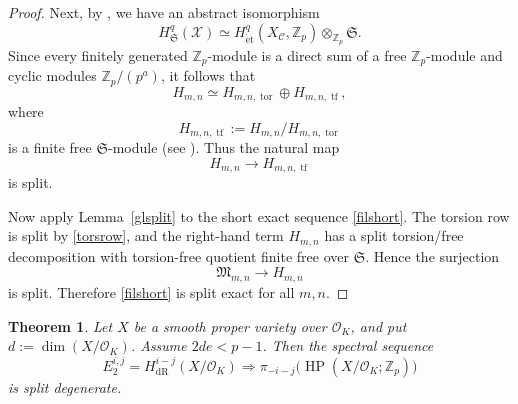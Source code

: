 \documentclass[11pt]{amsart}
\newtheorem{thm}[lemma]{Theorem}
\numberwithin{equation}{section}
\newcommand{\Z}{\mathbb{Z}}
\newcommand{\sC}{\mathcal{C}}
\newcommand{\sO}{\mathcal{O}}
\newcommand{\tf}{\operatorname{tf}}
\newcommand{\tors}{\operatorname{tor}}
\newcommand{\sX}{\mathcal{X}}
\newcommand{\mf}{\mathfrak}
\newcommand{\fM}{\mf{M}}
\newcommand{\dR}{\operatorname{{dR}}}
\newcommand{\et}{{\operatorname{\acute{e}t}}}
\newcommand{\mS}{\mf{S}}
\numberwithin{equation}{section}
\newcommand{\HP}{\operatorname{HP}}
\begin{document}
\begin{proof}
Next, by \cite[Theorem 5.11]{M21}, we have an abstract isomorphism
\[
  H_{\mS}^{q}(\sX)
  \simeq
  H_{\et}^{q}(X_{\sC},\Z_p)\otimes_{\Z_p}\mS.
\]
Since every finitely generated $\Z_p$-module is a direct sum of a free
$\Z_p$-module and cyclic modules $\Z_p/(p^a)$, it follows that
\[
  H_{m,n}
  \simeq
  H_{m,n,\tors}
  \oplus
  H_{m,n,\tf},
\]
where
\[
  H_{m,n,\tf}:=H_{m,n}/H_{m,n,\tors}
\]
is a finite free $\mS$-module (see \cite[Theorem 5.11]{M21}). Thus the natural map
\[
  H_{m,n}\to H_{m,n,\tf}
\]
is split.

Now apply Lemma~\ref{glsplit} to the short exact
sequence \eqref{filshort}. The torsion row is split by
\eqref{torsrow}, and the right-hand term $H_{m,n}$ has a split
torsion/free decomposition with torsion-free quotient finite free over
$\mS$. Hence the surjection
\[
  \fM_{m,n}\to H_{m,n}
\]
is split. Therefore \eqref{filshort} is split exact for all
$m,n$.
\end{proof}
\begin{thm}\label{hpdege}
Let $X$ be a smooth proper variety over $\sO_K$, and put $d:=\dim(X/\sO_K)$. Assume $2de<p-1$. Then the spectral sequence
\[
  E_2^{i,j}
  =
  H_{\dR}^{i-j}(X/\sO_K)
  \Longrightarrow
  \pi_{-i-j}\bigl(
    \HP(X/\sO_K;\Z_p)
  \bigr)
\]
is split degenerate. 
\end{thm}
\end{document}
